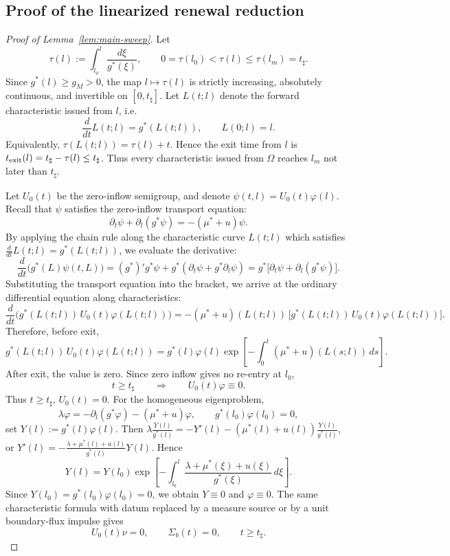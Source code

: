 \documentclass[pdflatex,sn-mathphys-num]{sn-jnl}
\theoremstyle{thmstyleone}
\theoremstyle{definition}
\theoremstyle{remark}
\newcommand{\Om}{\Omega}
\numberwithin{equation}{section}
\begin{document}
\subsection{Proof of the linearized renewal reduction}
\label{subsec:proof-renewal}
\begin{proof}[Proof of Lemma~\ref{lem:main-sweep}]
Let
\[
\tau(l):=\int_{l_0}^{l}\frac{d\xi}{g^*(\xi)},
\qquad
0=\tau(l_0)<\tau(l)\le \tau(l_m)=t_\sharp .
\]
Since \(g^*(l)\ge g_M>0\), the map
$\displaystyle 
l\mapsto \tau(l)$
is strictly increasing, absolutely continuous, and invertible on
\([0,t_\sharp]\). Let
$\displaystyle 
L(t;l)$
denote the forward characteristic issued from \(l\), i.e.
\[
\frac{d}{dt}L(t;l)=g^*(L(t;l)),
\qquad
L(0;l)=l .
\]
Equivalently,
$\displaystyle \tau(L(t;l))=\tau(l)+t$.
Hence the exit time from \(l\) is
$\displaystyle t_{\rm exit}(l)=t_\sharp-\tau(l)\le t_\sharp$.
Thus every characteristic issued from \(\Om\) reaches \(l_m\) not later than
\(t_\sharp\).

Let \(U_0(t)\) be the zero-inflow semigroup, and denote \(\psi(t, l) = U_0(t)\varphi(l)\). Recall that \(\psi\) satisfies the zero-inflow transport equation:
\[
\partial_t \psi + \partial_l (g^* \psi) = -(\mu^*+u)\psi.
\]
By applying the chain rule along the characteristic curve \(L(t;l)\) which satisfies \(\frac{d}{dt}L(t;l) = g^*(L(t;l))\), we evaluate the derivative:
\[
\frac{d}{dt}\big(g^*(L)\psi(t,L)\big) 
= (g^*)'g^*\psi + g^*(\partial_t \psi + g^*\partial_l \psi) 
= g^*\big[\partial_t \psi + \partial_l (g^*\psi)\big].
\]
Substituting the transport equation into the bracket, we arrive at the ordinary differential equation along characteristics:
\[
\frac{d}{dt}\big(g^*(L(t;l))\,U_0(t)\varphi(L(t;l))\big)
=
-(\mu^*+u)(L(t;l))\,\big[ g^*(L(t;l))\,U_0(t)\varphi(L(t;l)) \big].
\]
Therefore, before exit,
\[
g^*(L(t;l))\,U_0(t)\varphi(L(t;l))
=
g^*(l)\varphi(l)
\exp\!\left[
-\int_0^t(\mu^*+u)(L(s;l))\,ds
\right].
\]
After exit, the value is zero. Since zero inflow gives no re-entry at \(l_0\),
\[
t\ge t_\sharp
\qquad\Longrightarrow\qquad
U_0(t)\varphi\equiv0.
\]
Thus $t\ge t_\sharp$,
$U_0(t)=0$.
For the homogeneous eigenproblem,
\[
\lambda\varphi
=
-\partial_l(g^*\varphi)-(\mu^*+u)\varphi,
\qquad
g^*(l_0)\varphi(l_0)=0,
\]
set
$\displaystyle 
Y(l):=g^*(l)\varphi(l)$.
Then
$\displaystyle 
\lambda\frac{Y(l)}{g^*(l)}
=
-Y'(l)-(\mu^*(l)+u(l))\frac{Y(l)}{g^*(l)}$,
or
$\displaystyle 
Y'(l)
=
-\frac{\lambda+\mu^*(l)+u(l)}{g^*(l)}Y(l)$.
Hence
\[
Y(l)
=
Y(l_0)
\exp\!\left[
-\int_{l_0}^{l}
\frac{\lambda+\mu^*(\xi)+u(\xi)}{g^*(\xi)}\,d\xi
\right].
\]
Since
$\displaystyle 
Y(l_0)=g^*(l_0)\varphi(l_0)=0$,
we obtain
$Y\equiv0$ and
$\varphi\equiv0$.
The same characteristic formula with datum replaced by a measure source or by a
unit boundary-flux impulse gives
\[
U_0(t)\nu=0,
\qquad
\Sigma_b(t)=0,
\qquad
t\ge t_\sharp .
\]
\end{proof}
\end{document}
